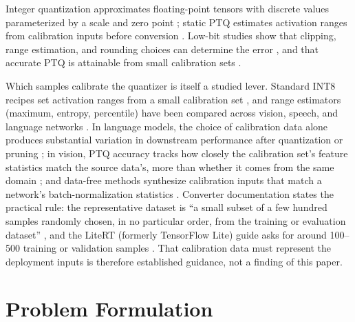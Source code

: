 \documentclass[10pt,twocolumn]{article}
\begin{document}
Integer quantization approximates floating-point tensors with discrete values
parameterized by a scale and zero point \cite{jacob2018quantization}; static
PTQ estimates activation ranges from calibration inputs before conversion
\cite{pytorchPT2E2026,googleRepresentativeData}.
Low-bit studies show that clipping, range estimation, and rounding choices
can determine the error \cite{banner2019ptq,nagel2020adaround}, and
that accurate PTQ is attainable from small calibration sets
\cite{hubara2021smallcalibration}.

Which samples calibrate the quantizer is itself a studied lever. Standard
INT8 recipes set activation ranges from a small calibration
set \cite{krishnamoorthi2018quantizing,nagel2021whitepaper}, and range
estimators (maximum, entropy, percentile) have been compared across vision,
speech, and language networks \cite{wu2020integer}. In language models, the
choice of calibration data alone produces substantial variation in
downstream performance after quantization or pruning
\cite{williams2024calibration}; in vision, PTQ accuracy tracks how closely
the calibration set's feature statistics match the source data's, more than
whether it comes from the same domain \cite{yu2021crossdomain}; and
data-free methods synthesize calibration inputs that match a network's
batch-normalization statistics \cite{cai2020zeroq}. Converter documentation
states the practical rule: the representative dataset is ``a small subset
of a few hundred samples randomly chosen, in no particular order, from the
training or evaluation dataset'' \cite{googleRepresentativeData}, and the
LiteRT (formerly TensorFlow Lite) guide asks for around 100--500 training or
validation samples \cite{googleLiteRTQuantization}. That calibration data
must represent the deployment inputs is therefore established guidance, not
a finding of this paper.

\section{Problem Formulation}
\end{document}
